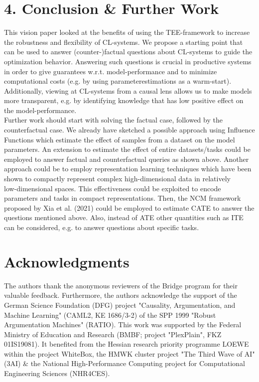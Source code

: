 \documentclass[10pt]{article}
\begin{document}
\section*{4. Conclusion \& Further Work}
This vision paper looked at the benefits of using the TEE-framework to increase the robustness and flexibility of CL-systems. We propose a starting point that can be used to answer (counter-)factual questions about CL-systems to guide the optimization behavior. Answering such questions is crucial in productive systems in order to give guarantees w.r.t. model-performance and to minimize computational costs (e.g. by using parameterestimations as a warm-start). Additionally, viewing at CL-systems from a causal lens allows us to make models more transparent, e.g. by identifying knowledge that has low positive effect on the model-performance.\\
Further work should start with solving the factual case, followed by the counterfactual case. We already have sketched a possible approach using Influence Functions which estimate the effect of samples from a dataset on the model parameters. An extension to estimate the effect of entire datasets/tasks could be employed to answer factual and counterfactual queries as shown above. Another approach could be to employ representation learning techniques which have been shown to compactly represent complex high-dimensional data in relatively\\
low-dimensional spaces. This effectiveness could be exploited to encode parameters and tasks in compact representations. Then, the NCM framework proposed by Xia et al. (2021) could be employed to estimate CATE to answer the questions mentioned above. Also, instead of ATE other quantities such as ITE can be considered, e.g. to answer questions about specific tasks.

\section*{Acknowledgments}
The authors thank the anonymous reviewers of the Bridge program for their valuable feedback. Furthermore, the authors acknowledge the support of the German Science Foundation (DFG) project "Causality, Argumentation, and Machine Learning" (CAML2, KE 1686/3-2) of the SPP 1999 "Robust Argumentation Machines" (RATIO). This work was supported by the Federal Ministry of Education and Research (BMBF; project "PlexPlain", FKZ 01IS19081). It benefited from the Hessian research priority programme LOEWE within the project WhiteBox, the HMWK cluster project "The Third Wave of AI" (3AI) \& the National High-Performance Computing project for Computational Engineering Sciences (NHR4CES).
\end{document}
